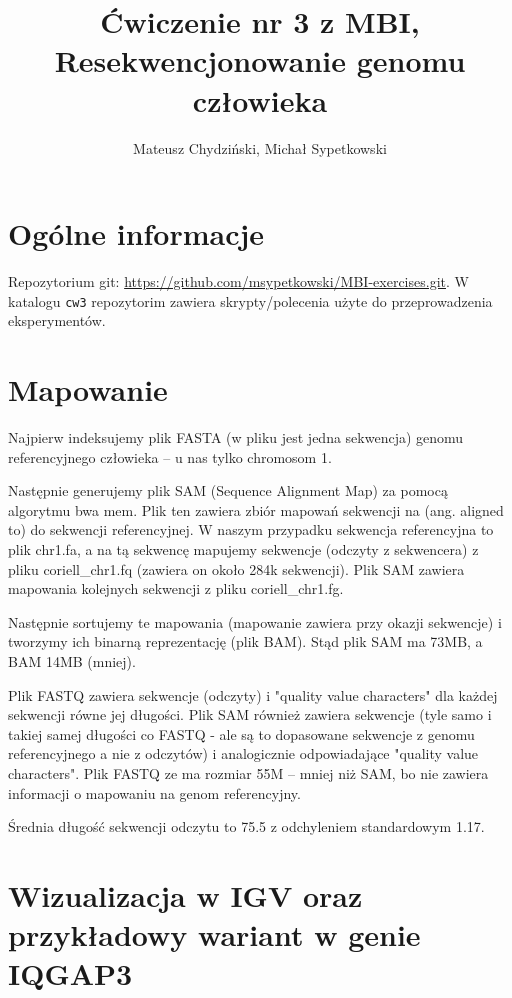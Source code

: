 \documentclass[a4paper]{article}
\begin{document}
\title{Ćwiczenie nr 3 z MBI, Resekwencjonowanie genomu człowieka}
\author{Mateusz Chydziński, Michał Sypetkowski}
\maketitle

\section{Ogólne informacje}
Repozytorium git: \url{https://github.com/msypetkowski/MBI-exercises.git}.
W katalogu \texttt{cw3} repozytorim zawiera skrypty/polecenia użyte do przeprowadzenia eksperymentów.

\section{Mapowanie}

Najpierw indeksujemy plik FASTA (w pliku jest jedna sekwencja) genomu referencyjnego człowieka --
u nas tylko chromosom 1.

Następnie generujemy plik SAM (Sequence Alignment Map) za pomocą algorytmu bwa mem.
Plik ten zawiera zbiór mapowań sekwencji na (ang. aligned to) do sekwencji referencyjnej.
W naszym przypadku sekwencja referencyjna to plik chr1.fa,
a na tą sekwencę mapujemy sekwencje (odczyty z sekwencera)
z pliku coriell\_chr1.fq (zawiera on około 284k sekwencji).
Plik SAM zawiera mapowania kolejnych sekwencji z pliku coriell\_chr1.fg.

Następnie sortujemy te mapowania (mapowanie zawiera przy okazji sekwencje)
i tworzymy ich binarną reprezentację (plik BAM).
Stąd plik SAM ma 73MB, a BAM 14MB (mniej).

Plik FASTQ zawiera sekwencje (odczyty) i "quality value characters"
dla każdej sekwencji równe jej długości.
Plik SAM również zawiera sekwencje (tyle samo i takiej samej długości co FASTQ - 
ale są to dopasowane sekwencje z genomu referencyjnego a nie z odczytów)
i analogicznie odpowiadające "quality value characters".
Plik FASTQ ze ma rozmiar 55M --
mniej niż SAM, bo nie zawiera informacji o mapowaniu na genom referencyjny.

Średnia długość sekwencji odczytu to 75.5 z odchyleniem standardowym 1.17.

\section{Wizualizacja w IGV oraz przykładowy wariant w genie IQGAP3}  
\end{document}
